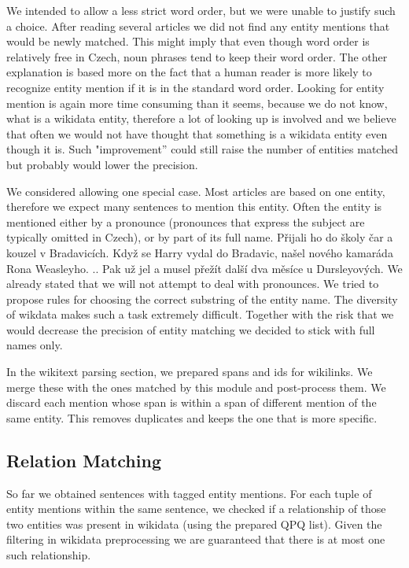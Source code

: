 We intended to allow a less strict word order, but we were unable to justify such a choice. After reading several articles we did not find any entity mentions that would be newly matched. This might imply that even though word order is relatively free in Czech, noun phrases tend to keep their word order. The other explanation is based more on the fact that a human reader is more likely to recognize entity mention if it is in the standard word order. Looking for entity mention is again more time consuming than it seems, because we do not know, what is a wikidata entity, therefore a lot of looking up is involved and we believe that often we would not have thought that something is a wikidata entity even though it is. Such "improvement” could still raise the number of entities matched but probably would lower the precision.

We considered allowing one special case. Most articles are based on one entity, therefore we expect many sentences to mention this entity. Often the entity is mentioned either by a pronounce (pronounces that express the subject are typically omitted in Czech), or by part of its full name.  Přijali ho do školy čar a kouzel v Bradavicích. Když se Harry vydal do Bradavic, našel nového kamaráda Rona Weasleyho. .. Pak už jel  a musel přežít další dva měsíce u Dursleyových. We already stated that we will not attempt to deal with pronounces. We tried to propose rules for choosing the correct substring of the entity name. The diversity of wikdata makes such a task extremely difficult. Together with the risk that we would decrease the precision of entity matching we decided to stick with full names only.

In the wikitext parsing section, we prepared spans and ids for wikilinks. We merge these with the ones matched by this module and post-process them. We discard each mention whose span is within a span of different mention of the same entity. This removes duplicates and keeps the one that is more specific.




\subsection{Relation Matching}
So far we obtained sentences with tagged entity mentions. For each tuple of entity mentions within the same sentence, we checked if a relationship of those two entities was present in wikidata (using the prepared QPQ list). Given the filtering in wikidata preprocessing we are guaranteed that there is at most one such relationship. 

